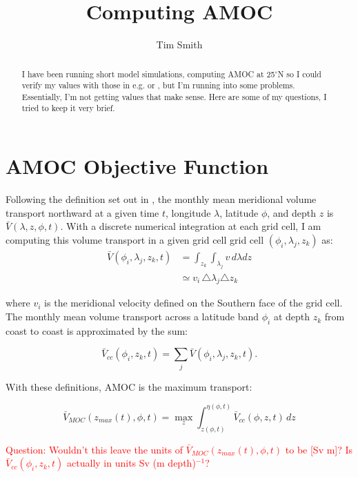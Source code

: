 \documentclass[a4paper,11pt]{article}
\title{\vspace{-10ex}Computing AMOC}
\author{Tim Smith}
\date{\vspace{-3ex}}
\newcommand{\red}[1]{\textcolor{red}{#1}}
\begin{document}
\maketitle

\begin{abstract}
 I have been running short model simulations, computing AMOC at 25$^{\circ}$N so I could verify my values with those in e.g. \cite{wunschAndHeimbach_AMOC} or \cite{mcCarthy}, but I'm running into some problems. Essentially, I'm not getting values that make sense. Here are some of my questions, I tried to keep it very brief. 
\end{abstract}


\section{AMOC Objective Function}

  Following the definition set out in \cite{wunschAndHeimbach_AMOC}, the monthly mean meridional volume transport northward at a given time $t$, longitude $\lambda$, latitude $\phi$, and depth $z$ is $\bar{V}(\lambda,z,\phi,t)$. With a discrete numerical integration at each grid cell, I am computing this volume transport in a given grid cell grid cell $(\phi_i,\lambda_j,z_k)$ as: 
  \begin{align}
    \bar{V}(\phi_i,\lambda_j,z_k,t) &= \int_{z_k}\int_{\lambda_j}v \,d\lambda dz \\
				    &\simeq v_i \,  \triangle \lambda_j \triangle z_k
    \label{eq:volTrans}
  \end{align}
  
  where $v_i$ is the meridional velocity defined on the Southern face of the grid cell. The monthly mean volume transport across a latitude band $\phi_i$ at depth $z_k$ from coast to coast is approximated by the sum: 
  
  \begin{equation}
    \bar{V}_{cc}(\phi_i,z_k,t) = \sum_{j}\bar{V}(\phi_i,\lambda_j,z_k,t) .
    \label{eq:vcc}
  \end{equation}

  With these definitions, AMOC is the maximum transport: 
  
  \begin{equation}
    \bar{V}_{MOC}(z_{max}(t),\phi,t) = \max_z\int_{z(\phi,t)}^{\eta(\phi,t)}\bar{V}_{cc}(\phi,z,t) \, dz
    \label{eq:amoc}
  \end{equation}

  \red{Question: Wouldn't this leave the units of $ \bar{V}_{MOC}(z_{max}(t),\phi,t)$ to be [Sv m]? Is $\bar{V}_{cc}(\phi_i,z_k,t)$ actually in units Sv (m depth)$^{-1}$?}
  
\end{document}
